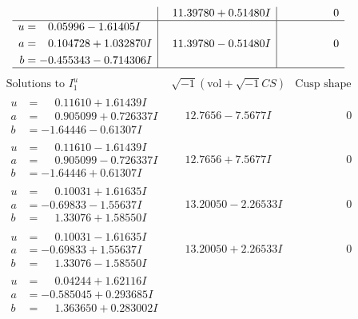 \documentclass[1p]{elsarticle_modified}
\theoremstyle{definition}
\newcommand{\I}{\sqrt{-1}}
\begin{document}
$$\begin{array}{c|c|c}
 & \phantom{-}11.39780 + 0.51480 I & \phantom{-0.000000 } 0 \\ \hline\begin{aligned}
u &= \phantom{-}0.05996 - 1.61405 I \\
a &= \phantom{-}0.104728 + 1.032870 I \\
b &= -0.455343 - 0.714306 I\end{aligned}
 & \phantom{-}11.39780 - 0.51480 I & \phantom{-0.000000 } 0\\
 \hline 
 \end{array}$$\newpage$$\begin{array}{c|c|c}  
\text{Solutions to }I^u_{1}& \I (\text{vol} + \sqrt{-1}CS) & \text{Cusp shape}\\
 \hline 
\begin{aligned}
u &= \phantom{-}0.11610 + 1.61439 I \\
a &= \phantom{-}0.905099 + 0.726337 I \\
b &= -1.64446 - 0.61307 I\end{aligned}
 & \phantom{-}12.7656 - 7.5677 I & \phantom{-0.000000 } 0 \\ \hline\begin{aligned}
u &= \phantom{-}0.11610 - 1.61439 I \\
a &= \phantom{-}0.905099 - 0.726337 I \\
b &= -1.64446 + 0.61307 I\end{aligned}
 & \phantom{-}12.7656 + 7.5677 I & \phantom{-0.000000 } 0 \\ \hline\begin{aligned}
u &= \phantom{-}0.10031 + 1.61635 I \\
a &= -0.69833 - 1.55637 I \\
b &= \phantom{-}1.33076 + 1.58550 I\end{aligned}
 & \phantom{-}13.20050 - 2.26533 I & \phantom{-0.000000 } 0 \\ \hline\begin{aligned}
u &= \phantom{-}0.10031 - 1.61635 I \\
a &= -0.69833 + 1.55637 I \\
b &= \phantom{-}1.33076 - 1.58550 I\end{aligned}
 & \phantom{-}13.20050 + 2.26533 I & \phantom{-0.000000 } 0 \\ \hline\begin{aligned}
u &= \phantom{-}0.04244 + 1.62116 I \\
a &= -0.585045 + 0.293685 I \\
b &= \phantom{-}1.363650 + 0.283002 I\end{aligned}

\end{array}$$
\end{document}
